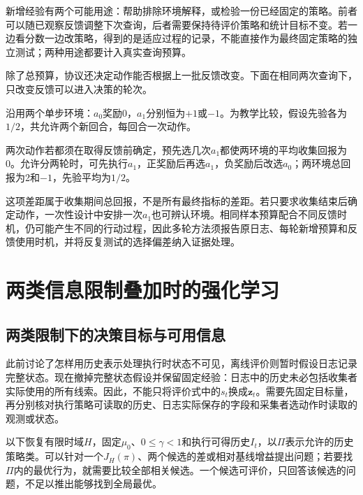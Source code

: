 新增经验有两个可能用途：帮助排除环境解释，或检验一份已经固定的策略。前者可以随已观察反馈调整下次查询，后者需要保持待评价策略和统计目标不变。若一边看分数一边改策略，得到的是适应过程的记录，不能直接作为最终固定策略的独立测试；两种用途都要计入真实查询预算。

除了总预算，协议还决定动作能否根据上一批反馈改变。下面在相同两次查询下，只改变反馈可以进入决策的轮次。

\begin{example}[相同两次查询与不同适应轮次]
  \label{ex:rl-information-batches}
  沿用两个单步环境：$a_0$奖励0，$a_1$分别恒为$+1$或$-1$。为教学比较，假设先验各为$1/2$，共允许两个新回合，每回合一次动作。

  两次动作若都须在取得反馈前确定，预先选几次$a_1$都使两环境的平均收集回报为0。允许分两轮时，可先执行$a_1$，正奖励后再选$a_1$，负奖励后改选$a_0$；两环境总回报为2和$-1$，先验平均为$1/2$。
\end{example}

这项差距属于收集期间总回报，不是所有最终指标的差距。若只要求收集结束后确定动作，一次性设计中安排一次$a_1$也可辨认环境。相同样本预算配合不同反馈时机，仍可能产生不同的行动过程，因此多轮方法须报告原日志、每轮新增预算和反馈使用时机，并将反复测试的选择偏差纳入证据处理。

\section{两类信息限制叠加时的强化学习}
\label{sec:rl-information-combined}

\subsection{两类限制下的决策目标与可用信息}
\label{sec:rl-information-combined-target}

此前讨论了怎样用历史表示处理执行时状态不可见，离线评价则暂时假设日志记录完整状态。现在撤掉完整状态假设并保留固定经验：日志中的历史未必包括收集者实际使用的所有线索。因此，不能只将评价式中的$s_t$换成$\bm z_t$。需要先固定目标量，再分别核对执行策略可读取的历史、日志实际保存的字段和采集者选动作时读取的观测或状态。

以下恢复有限时域$H$，固定$\mu_0$、$0\leq\gamma<1$和执行可得历史$I_t$，以$\Pi$表示允许的历史策略类。可以针对一个$J_H(\pi)$、两个候选的差或相对基线增益提出问题；若要找$\Pi$内的最优行为，就需要比较全部相关候选。一个候选可评价，只回答该候选的问题，不足以推出能够找到全局最优。

